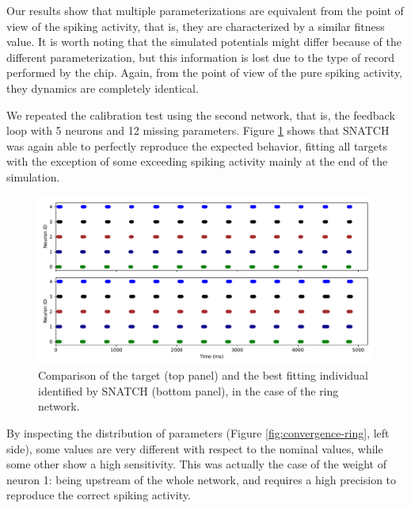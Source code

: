 \documentclass[utf8]{frontiersFPHY} %
\newcommand {\name}{SNATCH}
\begin{document}
Our results show that multiple parameterizations
are equivalent from the point of view of the spiking activity, that is, they are characterized by a similar fitness value.
It is worth noting that the simulated potentials
might differ because of the different parameterization, but this information is lost due to the type of record performed by the chip. 
Again, from the point of view of the pure spiking activity, they
dynamics are  completely identical.

We repeated the calibration test using the second network, that is, the feedback loop with 5 neurons and 12 missing parameters. 
Figure \ref{fig:target-ring} shows that \name{} was again able to perfectly reproduce the expected behavior, fitting all targets with the exception of some exceeding spiking activity mainly at the end of the simulation.

\begin{figure}[!ht]
	\centering
	\includegraphics[width=\textwidth]{images/ring-network-regular/target_sim.pdf}
	\caption{Comparison of the target (top panel) and the best fitting individual identified by \name{} (bottom panel), in the case of the ring network.}
	\label{fig:target-ring}
\end{figure}

By inspecting the distribution of parameters (Figure \ref{fig:convergence-ring}, left side), some values are very different with respect to the nominal values, while some other show a high sensitivity. 
This was actually the case of the  weight of neuron 1: being upstream of the whole network, and requires a high precision to reproduce the correct spiking  activity.
\end{document}
